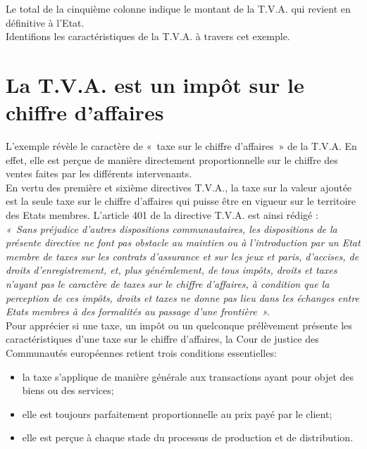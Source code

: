 \documentclass{book}
\begin{document}
\null

Le total de la cinquième colonne indique le montant de la T.V.A. qui revient en définitive à
l'Etat.\\

Identifions les caractéristiques de la T.V.A. à travers cet exemple.

\section{La T.V.A. est un impôt sur le chiffre d'affaires}

L'exemple révèle le caractère de «~taxe sur le chiffre d'affaires~» de la T.V.A. En effet, elle
est perçue de manière directement proportionnelle sur le chiffre des ventes faites par les
différents intervenants.\\

En vertu des première et sixième directives T.V.A., la taxe sur la valeur ajoutée est la seule
taxe sur le chiffre d'affaires qui puisse être en vigueur sur le territoire des Etats membres.
L’article 401 de la directive T.V.A. est ainsi rédigé :\\

\textit{«~Sans préjudice d’autres dispositions communautaires, les dispositions de la présente
directive ne font pas obstacle au maintien ou à l’introduction par un Etat membre de taxes sur
les contrats d’assurance et sur les jeux et paris, d’accises, de droits d’enregistrement, et, plus
généralement, de tous impôts, droits et taxes n’ayant pas le caractère de taxes sur le chiffre
d’affaires, à condition que la perception de ces impôts, droits et taxes ne donne pas lieu dans
les échanges entre Etats membres à des formalités au passage d’une frontière~».}\\

Pour apprécier si une taxe, un impôt ou un quelconque prélèvement présente les
caractéristiques d'une taxe sur le chiffre d'affaires, la Cour de justice des Communautés
européennes retient trois conditions essentielles:\\

\begin{itemize}
\item la taxe s'applique de manière générale aux transactions ayant pour objet des biens
ou des services;
\item elle est toujours parfaitement proportionnelle au prix payé par le client;
\item elle est perçue à chaque stade du processus de production et de distribution.
\end{itemize}
\end{document}
